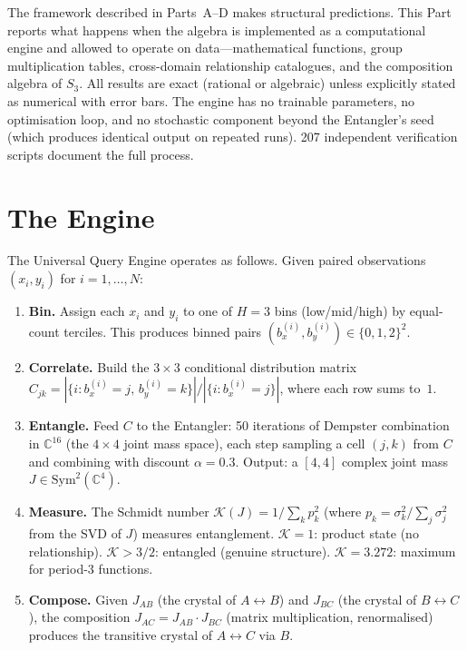 \documentclass[11pt,a4paper]{article}
\theoremstyle{definition}
\theoremstyle{remark}
\newcommand{\C}{\mathbb{C}}
\begin{document}
The framework described in Parts~A--D makes structural predictions. This Part reports what happens when the algebra is implemented as a computational engine and allowed to operate on data---mathematical functions, group multiplication tables, cross-domain relationship catalogues, and the composition algebra of $S_3$. All results are exact (rational or algebraic) unless explicitly stated as numerical with error bars. The engine has no trainable parameters, no optimisation loop, and no stochastic component beyond the Entangler's seed (which produces identical output on repeated runs). 207 independent verification scripts document the full process.

\section{The Engine}\label{sec:engine}

The Universal Query Engine operates as follows. Given paired observations $(x_i, y_i)$ for $i=1,\ldots,N$:

\begin{enumerate}[nosep]
\item \textbf{Bin.} Assign each $x_i$ and $y_i$ to one of $H=3$ bins (low/mid/high) by equal-count terciles. This produces binned pairs $(b_x^{(i)}, b_y^{(i)}) \in \{0,1,2\}^2$.
\item \textbf{Correlate.} Build the $3\times 3$ conditional distribution matrix $C_{jk} = |\{i : b_x^{(i)}=j,\, b_y^{(i)}=k\}| / |\{i : b_x^{(i)}=j\}|$, where each row sums to~$1$.
\item \textbf{Entangle.} Feed $C$ to the Entangler: 50 iterations of Dempster combination in $\C^{16}$ (the $4\times 4$ joint mass space), each step sampling a cell $(j,k)$ from $C$ and combining with discount $\alpha=0.3$. Output: a $[4,4]$ complex joint mass $J \in \mathrm{Sym}^2(\C^4)$.
\item \textbf{Measure.} The Schmidt number $\mathcal{K}(J) = 1/\sum_k p_k^2$ (where $p_k = \sigma_k^2/\sum_j \sigma_j^2$ from the SVD of $J$) measures entanglement. $\mathcal{K}=1$: product state (no relationship). $\mathcal{K}>3/2$: entangled (genuine structure). $\mathcal{K}=3.272$: maximum for period-$3$ functions.
\item \textbf{Compose.} Given $J_{AB}$ (the crystal of $A\leftrightarrow B$) and $J_{BC}$ (the crystal of $B\leftrightarrow C$), the composition $J_{AC} = J_{AB} \cdot J_{BC}$ (matrix multiplication, renormalised) produces the transitive crystal of $A\leftrightarrow C$ via $B$.
\end{enumerate}
\end{document}
